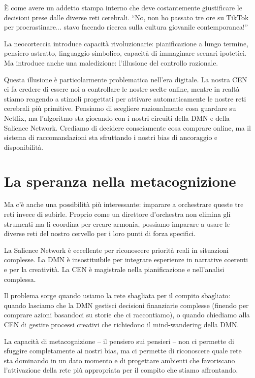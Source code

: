 È come avere un addetto stampa interno che deve costantemente giustificare le decisioni prese dalle diverse reti cerebrali. ``No, non ho passato tre ore su TikTok per procrastinare... stavo facendo ricerca sulla cultura giovanile contemporanea!''

La neocorteccia introduce capacità rivoluzionarie: pianificazione a lungo termine, pensiero astratto, linguaggio simbolico, capacità di immaginare scenari ipotetici. Ma introduce anche una maledizione: l'illusione del controllo razionale.

Questa illusione è particolarmente problematica nell'era digitale. La nostra CEN ci fa credere di essere noi a controllare le nostre scelte online, mentre in realtà stiamo reagendo a stimoli progettati per attivare automaticamente le nostre reti cerebrali più primitive. Pensiamo di scegliere razionalmente cosa guardare su Netflix, ma l'algoritmo sta giocando con i nostri circuiti della DMN e della Salience Network. Crediamo di decidere consciamente cosa comprare online, ma il sistema di raccomandazioni sta sfruttando i nostri bias di ancoraggio e disponibilità.

\section{La speranza nella metacognizione}

Ma c'è anche una possibilità più interessante: imparare a orchestrare queste tre reti invece di subirle. Proprio come un direttore d'orchestra non elimina gli strumenti ma li coordina per creare armonia, possiamo imparare a usare le diverse reti del nostro cervello per i loro punti di forza specifici.

La Salience Network è eccellente per riconoscere priorità reali in situazioni complesse. La DMN è insostituibile per integrare esperienze in narrative coerenti e per la creatività. La CEN è magistrale nella pianificazione e nell'analisi complessa.

Il problema sorge quando usiamo la rete sbagliata per il compito sbagliato: quando lasciamo che la DMN gestisci decisioni finanziarie complesse (finendo per comprare azioni basandoci su storie che ci raccontiamo), o quando chiediamo alla CEN di gestire processi creativi che richiedono il mind-wandering della DMN.

La capacità di metacognizione – il pensiero sui pensieri – non ci permette di sfuggire completamente ai nostri bias, ma ci permette di riconoscere quale rete sta dominando in un dato momento e di progettare ambienti che favoriscano l'attivazione della rete più appropriata per il compito che stiamo affrontando.

